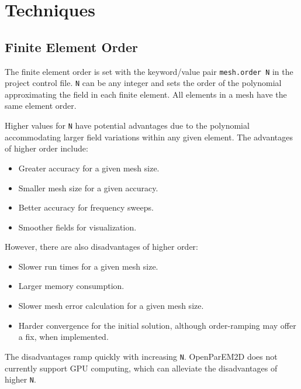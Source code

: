 \documentclass[titlepage]{article}
\renewcommand\_{\textunderscore\linebreak[1]}
\begin{document}
\section{Techniques}

\subsection{Finite Element Order}

The finite element order is set with the keyword/value pair \texttt{mesh.order N} in the project control file.  \texttt{N} can be any integer and sets the order of the polynomial approximating the field in each finite element.  All elements in a mesh have the same element order.

Higher values for \texttt{N} have potential advantages due to the polynomial accommodating larger field variations within any given element.  The advantages of higher order include:
\begin{itemize}
\item Greater accuracy for a given mesh size.
\item Smaller mesh size for a given accuracy.
\item Better accuracy for frequency sweeps.
\item Smoother fields for visualization.
\end{itemize}
\noindent However, there are also disadvantages of higher order:
\begin{itemize}
\item Slower run times for a given mesh size.
\item Larger memory consumption.
\item Slower mesh error calculation for a given mesh size.
\item Harder convergence for the initial solution, although order-ramping may offer a fix, when implemented.
\end{itemize}
\noindent The disadvantages ramp quickly with increasing \texttt{N}.
OpenParEM2D does not currently support GPU computing, which can alleviate the disadvantages of higher \texttt{N}.
\end{document}
